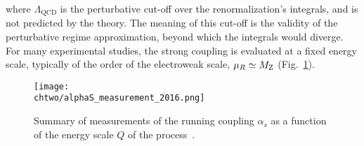 \noindent where $\Lambda_\mathrm{QCD}$ is the perturbative cut-off over the renormalization's integrals, and is not predicted by the theory.
The meaning of this cut-off is the validity of the perturbative regime approximation, beyond which the integrals would diverge.
For many experimental studies, the strong coupling is evaluated at a fixed energy scale, typically of the order of the electroweak scale, $\mu_R \simeq M_\mathrm{Z}$ (Fig.~\ref{fig:AlphaS}).

\begin{figure}[!htb]
  \centering
  \texttt{[image: \\chtwo/alphaS\_measurement\_2016.png]}
  \caption{Summary of measurements of the running coupling $\alpha_s$ as a function of the energy scale $Q$ of the process~\cite{Olive:2016xmw}.}
  \label{fig:AlphaS}
\end{figure} 